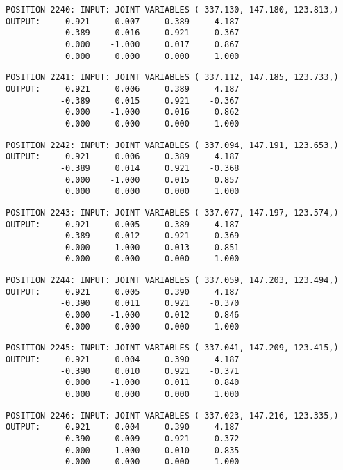 \begin{verbatim}
POSITION 2240: INPUT: JOINT VARIABLES ( 337.130, 147.180, 123.813,)
OUTPUT:     0.921     0.007     0.389     4.187
           -0.389     0.016     0.921    -0.367
            0.000    -1.000     0.017     0.867
            0.000     0.000     0.000     1.000
\end{verbatim} \pagebreak[1]\begin{verbatim}
POSITION 2241: INPUT: JOINT VARIABLES ( 337.112, 147.185, 123.733,)
OUTPUT:     0.921     0.006     0.389     4.187
           -0.389     0.015     0.921    -0.367
            0.000    -1.000     0.016     0.862
            0.000     0.000     0.000     1.000
\end{verbatim} \pagebreak[1]\begin{verbatim}
POSITION 2242: INPUT: JOINT VARIABLES ( 337.094, 147.191, 123.653,)
OUTPUT:     0.921     0.006     0.389     4.187
           -0.389     0.014     0.921    -0.368
            0.000    -1.000     0.015     0.857
            0.000     0.000     0.000     1.000
\end{verbatim} \pagebreak[1]\begin{verbatim}
POSITION 2243: INPUT: JOINT VARIABLES ( 337.077, 147.197, 123.574,)
OUTPUT:     0.921     0.005     0.389     4.187
           -0.389     0.012     0.921    -0.369
            0.000    -1.000     0.013     0.851
            0.000     0.000     0.000     1.000
\end{verbatim} \pagebreak[1]\begin{verbatim}
POSITION 2244: INPUT: JOINT VARIABLES ( 337.059, 147.203, 123.494,)
OUTPUT:     0.921     0.005     0.390     4.187
           -0.390     0.011     0.921    -0.370
            0.000    -1.000     0.012     0.846
            0.000     0.000     0.000     1.000
\end{verbatim} \pagebreak[1]\begin{verbatim}
POSITION 2245: INPUT: JOINT VARIABLES ( 337.041, 147.209, 123.415,)
OUTPUT:     0.921     0.004     0.390     4.187
           -0.390     0.010     0.921    -0.371
            0.000    -1.000     0.011     0.840
            0.000     0.000     0.000     1.000
\end{verbatim} \pagebreak[1]\begin{verbatim}
POSITION 2246: INPUT: JOINT VARIABLES ( 337.023, 147.216, 123.335,)
OUTPUT:     0.921     0.004     0.390     4.187
           -0.390     0.009     0.921    -0.372
            0.000    -1.000     0.010     0.835
            0.000     0.000     0.000     1.000
\end{verbatim} \pagebreak[1]\begin{verbatim}

\end{verbatim}
